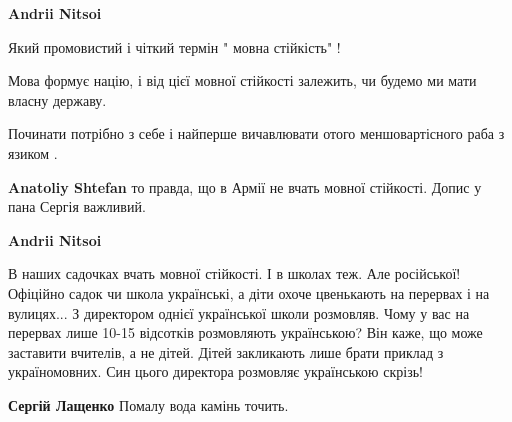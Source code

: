\begin{itemize}
\begin{itemize}
 
\textbf{Andrii Nitsoi} 

Який промовистий і чіткий термін " мовна стійкість" !

Мова формує націю, і від цієї мовної стійкості залежить, чи будемо ми мати
власну державу.

Починати потрібно з себе і найперше вичавлювати отого меншовартісного раба з
язиком .

 
\textbf{Anatoliy Shtefan} то правда, що в Армії не вчать мовної стійкості. Допис у пана Сергія важливий.

 
\textbf{Andrii Nitsoi} 

В наших садочках вчать мовної стійкості. І в школах теж. Але російської!
Офіційно садок чи школа українські, а діти охоче цвенькають на перервах і на
вулицях... З директором однієї української школи розмовляв. Чому у вас на
перервах лише 10-15 відсотків розмовляють українською? Він каже, що може
заставити вчителів, а не дітей. Дітей закликають лише брати приклад з
україномовних. Син цього директора розмовляє українською скрізь!


 
\textbf{Сергій Лащенко}
Помалу вода камінь точить.

 


\end{itemize}
\end{itemize}
